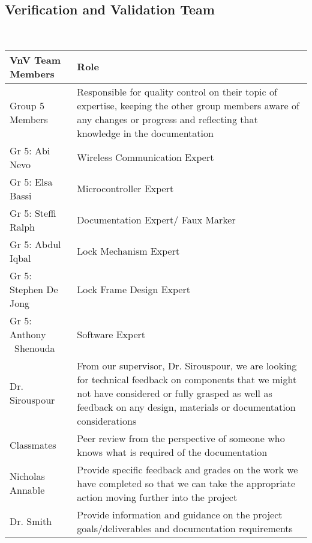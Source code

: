 \documentclass[12pt, titlepage]{article}
\begin{document}
\-\

  
~\newpage

\subsection{Verification and Validation Team}
\-\

 \begin{minipage}{\textwidth}
\renewcommand*{\arraystretch}{1.5}
\begin{tabular}{| p{} | p{} |}
 \hline
 VnV Team Members & Role \\ 
  \hline
 Group 5 Members & Responsible for quality control on their topic of expertise, keeping the other group members aware of any changes or progress and reflecting that knowledge in the documentation\\ 
 \hline
Gr 5: Abi Nevo & Wireless Communication Expert \\ 
  \hline
 Gr 5: Elsa Bassi & Microcontroller Expert \\ 
  \hline
 Gr 5: Steffi Ralph & Documentation Expert/ Faux Marker \\ 
  \hline
 Gr 5: Abdul Iqbal & Lock Mechanism Expert \\ 
  \hline
 Gr 5: Stephen De Jong & Lock Frame Design Expert \\ 
  \hline
  Gr 5: Anthony
  ~\newline Shenouda & Software Expert \\ 
  \hline
   Dr. Sirouspour & From our supervisor, Dr. Sirouspour, we are looking for technical feedback on components that we might not have considered or fully grasped as well as feedback on any design, materials or documentation considerations\\
  \hline
    Classmates & Peer review from the perspective of someone who knows what is required of the documentation \\
  \hline
   Nicholas Annable & Provide specific feedback and grades on the work we have completed so that we can take the appropriate action moving further into the project\\
  \hline
  Dr. Smith & Provide information and guidance on the project goals/deliverables and documentation requirements \\
  \hline

\end{tabular}
\end{minipage}\\
\end{document}
